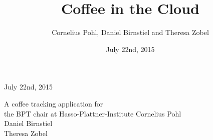 \documentclass[12pt]{article}
\title{Coffee in the Cloud}
\date{July 22nd, 2015}
\author{Cornelius Pohl, Daniel Birnstiel and Theresa Zobel}
\begin{document}

\vspace*{0.04 \textheight}
\begin{flushright}{\Large July 22nd, 2015}\\[0.16\textheight]\end{flushright}
\vspace*{0.04 \textheight}
\hspace*{0.3\textwidth}{\Huge\itshape Coffee in the Cloud}\par
\vspace{2cm}
\begin{center}\Large
A coffee tracking application for\\the BPT chair at Hasso-Plattner-Institute
\vfill
Cornelius Pohl \\ Daniel Birnstiel \\ Theresa Zobel\end{center}
\vspace*{0.08\textheight}

\restoregeometry

\newpage
\setcounter{tocdepth}{1}
\tableofcontents

\newpage
{} 

\end{document}
